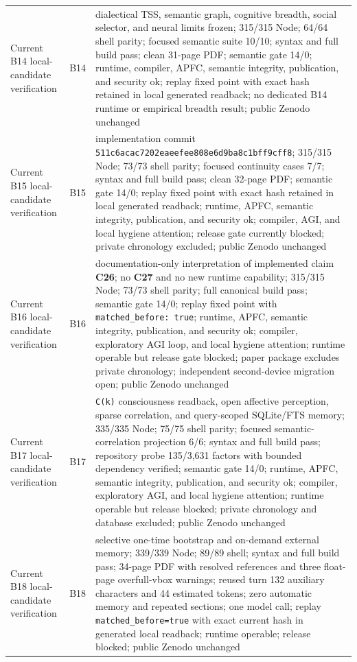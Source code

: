 \documentclass[10pt,twocolumn]{article}
\theoremstyle{definition}
\theoremstyle{plain}
\theoremstyle{remark}
\newcommand{\file}[1]{\nolinkurl{#1}}
\newcommand{\claimid}[1]{\textsf{\textbf{#1}}}
\newcommand{\dialecticrevision}{\textsf{B14}}
\newcommand{\portablerevision}{\textsf{B15}}
\newcommand{\identityportabilityrevision}{\textsf{B16}}
\newcommand{\openperceptionrevision}{\textsf{B17}}
\newcommand{\efficientcontextrevision}{\textsf{B18}}
\begin{document}
\begin{table}[!t]
\begin{tabularx}{\textwidth}{@{}p{}p{}X@{}}
Current B14 local-candidate verification & \dialecticrevision & dialectical TSS, semantic graph, cognitive breadth, social selector, and neural limits frozen; 315/315 Node; 64/64 shell parity; focused semantic suite 10/10; syntax and full build pass; clean 31-page PDF; semantic gate 14/0; runtime, compiler, APFC, semantic integrity, publication, and security ok; replay fixed point with exact hash retained in local generated readback; no dedicated B14 runtime or empirical breadth result; public Zenodo unchanged \\
Current B15 local-candidate verification & \portablerevision & implementation commit \file{511c6acac7202eaeefee808e6d9ba8c1bff9cff8}; 315/315 Node; 73/73 shell parity; focused continuity cases 7/7; syntax and full build pass; clean 32-page PDF; semantic gate 14/0; replay fixed point with exact hash retained in local generated readback; runtime, APFC, semantic integrity, publication, and security ok; compiler, AGI, and local hygiene attention; release gate currently blocked; private chronology excluded; public Zenodo unchanged \\
Current B16 local-candidate verification & \identityportabilityrevision & documentation-only interpretation of implemented claim \claimid{C26}; no \claimid{C27} and no new runtime capability; 315/315 Node; 73/73 shell parity; full canonical build pass; semantic gate 14/0; replay fixed point with \file{matched\_before: true}; runtime, APFC, semantic integrity, publication, and security ok; compiler, exploratory AGI loop, and local hygiene attention; runtime operable but release gate blocked; paper package excludes private chronology; independent second-device migration open; public Zenodo unchanged \\
Current B17 local-candidate verification & \openperceptionrevision & \file{C(k)} consciousness readback, open affective perception, sparse correlation, and query-scoped SQLite/FTS memory; 335/335 Node; 75/75 shell parity; focused semantic-correlation projection 6/6; syntax and full build pass; repository probe 135/3,631 factors with bounded dependency verified; semantic gate 14/0; runtime, APFC, semantic integrity, publication, and security ok; compiler, exploratory AGI, and local hygiene attention; runtime operable but release blocked; private chronology and database excluded; public Zenodo unchanged \\
Current B18 local-candidate verification & \efficientcontextrevision & selective one-time bootstrap and on-demand external memory; 339/339 Node; 89/89 shell; syntax and full build pass; 34-page PDF with resolved references and three float-page overfull-vbox warnings; reused turn 132 auxiliary characters and 44 estimated tokens; zero automatic memory and repeated sections; one model call; replay \file{matched\_before=true} with exact current hash in generated local readback; runtime operable; release blocked; public Zenodo unchanged \\
\bottomrule
\end{tabularx}
\end{table}


\begingroup
\small

\endgroup
\end{document}
